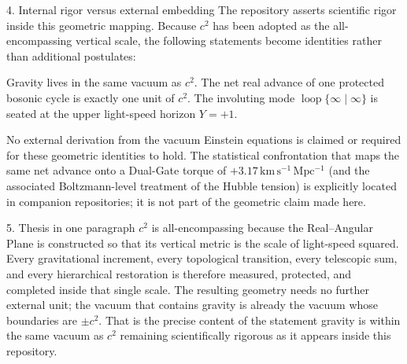 4. Internal rigor versus external embedding
The repository asserts scientific rigor inside this geometric mapping. Because \(c^2\) has been adopted as the all-encompassing vertical scale, the following statements become identities rather than additional postulates:

Gravity lives in the same vacuum as \(c^2\).
The net real advance of one protected bosonic cycle is exactly one unit of \(c^2\).
The involuting mode \(\operatorname{loop}\{\infty\mid\infty\}\) is seated at the upper light-speed horizon \(Y = +1\).

No external derivation from the vacuum Einstein equations is claimed or required for these geometric identities to hold. The statistical confrontation that maps the same net advance onto a Dual-Gate torque of \(+3.17\,\mathrm{km\,s^{-1}\,Mpc^{-1}}\) (and the associated Boltzmann-level treatment of the Hubble tension) is explicitly located in companion repositories; it is not part of the geometric claim made here.

5. Thesis in one paragraph
\(c^2\) is all-encompassing because the Real–Angular Plane is constructed so that its vertical metric is the scale of light-speed squared. Every gravitational increment, every topological transition, every telescopic sum, and every hierarchical restoration is therefore measured, protected, and completed inside that single scale. The resulting geometry needs no further external unit; the vacuum that contains gravity is already the vacuum whose boundaries are \(\pm c^2\). That is the precise content of the statement gravity is within the same vacuum as \(c^2\) remaining scientifically rigorous as it appears inside this repository.
